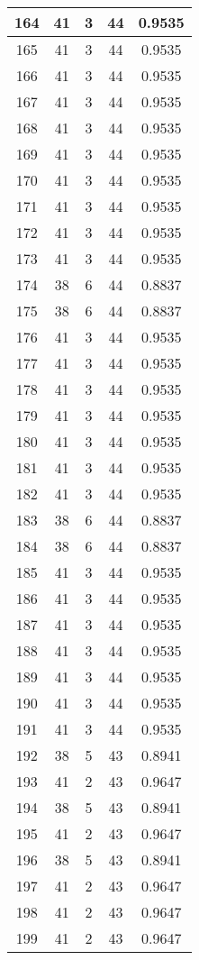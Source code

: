 \documentclass[letterpaper, 12pt]{article}
\begin{document}
\begin{longtable}{|c|c|c|c|c|}
\hline
164 & 41 & 3 & 44 & 0.9535 \\
\hline
165 & 41 & 3 & 44 & 0.9535 \\
\hline
166 & 41 & 3 & 44 & 0.9535 \\
\hline
167 & 41 & 3 & 44 & 0.9535 \\
\hline
168 & 41 & 3 & 44 & 0.9535 \\
\hline
169 & 41 & 3 & 44 & 0.9535 \\
\hline
170 & 41 & 3 & 44 & 0.9535 \\
\hline
171 & 41 & 3 & 44 & 0.9535 \\
\hline
172 & 41 & 3 & 44 & 0.9535 \\
\hline
173 & 41 & 3 & 44 & 0.9535 \\
\hline
174 & 38 & 6 & 44 & 0.8837 \\
\hline
175 & 38 & 6 & 44 & 0.8837 \\
\hline
176 & 41 & 3 & 44 & 0.9535 \\
\hline
177 & 41 & 3 & 44 & 0.9535 \\
\hline
178 & 41 & 3 & 44 & 0.9535 \\
\hline
179 & 41 & 3 & 44 & 0.9535 \\
\hline
180 & 41 & 3 & 44 & 0.9535 \\
\hline
181 & 41 & 3 & 44 & 0.9535 \\
\hline
182 & 41 & 3 & 44 & 0.9535 \\
\hline
183 & 38 & 6 & 44 & 0.8837 \\
\hline
184 & 38 & 6 & 44 & 0.8837 \\
\hline
185 & 41 & 3 & 44 & 0.9535 \\
\hline
186 & 41 & 3 & 44 & 0.9535 \\
\hline
187 & 41 & 3 & 44 & 0.9535 \\
\hline
188 & 41 & 3 & 44 & 0.9535 \\
\hline
189 & 41 & 3 & 44 & 0.9535 \\
\hline
190 & 41 & 3 & 44 & 0.9535 \\
\hline
191 & 41 & 3 & 44 & 0.9535 \\
\hline
192 & 38 & 5 & 43 & 0.8941 \\
\hline
193 & 41 & 2 & 43 & 0.9647 \\
\hline
194 & 38 & 5 & 43 & 0.8941 \\
\hline
195 & 41 & 2 & 43 & 0.9647 \\
\hline
196 & 38 & 5 & 43 & 0.8941 \\
\hline
197 & 41 & 2 & 43 & 0.9647 \\
\hline
198 & 41 & 2 & 43 & 0.9647 \\
\hline
199 & 41 & 2 & 43 & 0.9647 \\
\hline
\end{longtable}
\end{document}
